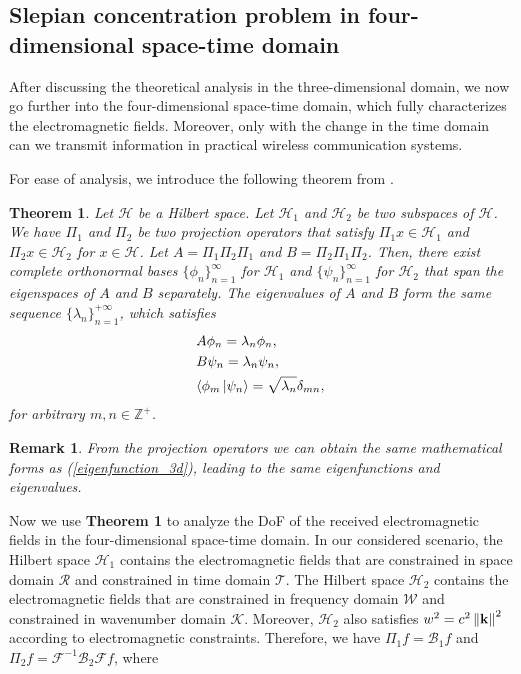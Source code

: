 \documentclass[12pt,draftclsnofoot,journal,onecolumn]{IEEEtran}
\newtheorem{theorem}{Theorem}
\newtheorem{remark}{Remark}
\begin{document}
	\subsection{Slepian concentration problem in four-dimensional space-time domain}
	\label{subsec_4d_slepian}
	
	After discussing the theoretical analysis in the three-dimensional domain, we now go further into the four-dimensional space-time domain, which fully characterizes the electromagnetic fields. Moreover, only with the change in the time domain can we transmit information in practical wireless communication systems.
	
	For ease of analysis, we introduce the following theorem from \cite{ihara1993information}.
	
	\begin{theorem}
		\cite{ihara1993information} Let $\mathcal{H}$ be a Hilbert space. Let $\mathcal{H}_1$ and $\mathcal{H}_2$ be two subspaces of $\mathcal{H}$. We have $\Pi_1$ and $\Pi_2$ be two projection operators that satisfy $\Pi_1 x \in \mathcal{H}_1$ and $\Pi_2 x \in \mathcal{H}_2$ for $x \in \mathcal{H}$. Let $A = \Pi_1 \Pi_2 \Pi_1$ and $B = \Pi_2 \Pi_1 \Pi_2$. Then, there exist complete orthonormal bases $\{\phi_n \}_{n=1}^{\infty}$ for $\mathcal{H}_1$ and $\{\psi_n \}_{n=1}^{\infty}$ for $\mathcal{H}_2$ that span the eigenspaces of $A$ and $B$ separately. The eigenvalues of $A$ and $B$ form the same sequence $\{\lambda_n \}_{n=1}^{+\infty}$, which satisfies
		\begin{subequations}
			\begin{align} 
				&A\phi_n = \lambda_n \phi_n, \label{Aphi}\\
				& B \psi_n = \lambda_n \psi_n,  \label{Bpsi}\\
				& \langle \phi_m \ket{\psi_n} = \sqrt{\lambda_n} \delta_{mn},
			\end{align}
		\end{subequations}
		for arbitrary $m,n\in \mathbb{Z}^+$.
	\end{theorem}
	\begin{remark}
		From the projection operators we can obtain the same mathematical forms as (\ref{eigenfunction_3d}), leading to the same eigenfunctions and eigenvalues. 
	\end{remark}
	Now we use {\bf Theorem 1} to analyze the DoF of the received electromagnetic fields in the four-dimensional space-time domain. In our considered scenario, the Hilbert space $\mathcal{H}_1$ contains the electromagnetic fields that are constrained in space domain $\mathcal{R}$ and constrained in time domain $\mathcal{T}$. The Hilbert space $\mathcal{H}_2$ contains the electromagnetic fields that are constrained in frequency domain $\mathcal{W}$ and constrained in wavenumber domain $\mathcal{K}$. Moreover, $\mathcal{H}_2$ also satisfies $w^2 = c^2\left\| {\bf k} \right\|^2 $ according to electromagnetic constraints. Therefore, we have $\Pi_1f = \mathcal{B}_1 f $ and $\Pi_2 f = \mathcal{F}^{-1} \mathcal{B}_2 \mathcal{F} f$, where 
\end{document}
